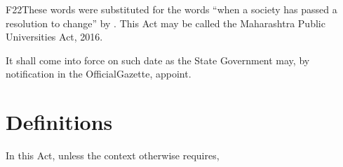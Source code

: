 \documentclass[reprint]{mhact}
\begin{document}
      \begin{subsectionlist}
    

  \begin{amendins}{F22}{These words were substituted for the words ``when a
      society has passed a resolution to change'' by
      .}
    This Act may be called the Maharashtra Public Universities Act,
    2016.
 \end{amendins} 
    

It shall come into force on such date as the State Government may, by notification in the OfficialGazette, appoint.

       \end{subsectionlist}
    
      \section{Definitions}
      
In this Act, unless the context otherwise requires,
\end{document}
